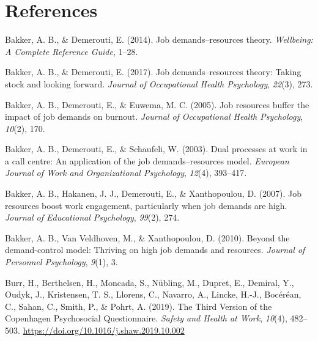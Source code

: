 \documentclass[
  man]{apa6}
\newlength{\cslhangindent}
\newlength{\cslentryspacingunit} %
\newenvironment{CSLReferences}[2] %
 {%
  \setlength{\parindent}{0pt}
  \ifodd #1
  \let\oldpar\par
  \def\par{\hangindent=\cslhangindent\oldpar}
  \fi
  \setlength{\parskip}{#2\cslentryspacingunit}
 }%
 {}
\begin{document}
\newpage

\hypertarget{references}{%
\section{References}\label{references}}

\begingroup
\setlength{\parindent}{-0.5in}
\setlength{\leftskip}{0.5in}

\hypertarget{refs}{}
\begin{CSLReferences}{1}{0}
\leavevmode{}%
Bakker, A. B., \& Demerouti, E. (2014). Job demands--resources theory. \emph{Wellbeing: A Complete Reference Guide}, 1--28.

\leavevmode{}%
Bakker, A. B., \& Demerouti, E. (2017). Job demands--resources theory: Taking stock and looking forward. \emph{Journal of Occupational Health Psychology}, \emph{22}(3), 273.

\leavevmode{}%
Bakker, A. B., Demerouti, E., \& Euwema, M. C. (2005). Job resources buffer the impact of job demands on burnout. \emph{Journal of Occupational Health Psychology}, \emph{10}(2), 170.

\leavevmode{}%
Bakker, A. B., Demerouti, E., \& Schaufeli, W. (2003). Dual processes at work in a call centre: An application of the job demands--resources model. \emph{European Journal of Work and Organizational Psychology}, \emph{12}(4), 393--417.

\leavevmode{}%
Bakker, A. B., Hakanen, J. J., Demerouti, E., \& Xanthopoulou, D. (2007). Job resources boost work engagement, particularly when job demands are high. \emph{Journal of Educational Psychology}, \emph{99}(2), 274.

\leavevmode{}%
Bakker, A. B., Van Veldhoven, M., \& Xanthopoulou, D. (2010). Beyond the demand-control model: Thriving on high job demands and resources. \emph{Journal of Personnel Psychology}, \emph{9}(1), 3.

\leavevmode{}%
Burr, H., Berthelsen, H., Moncada, S., Nübling, M., Dupret, E., Demiral, Y., Oudyk, J., Kristensen, T. S., Llorens, C., Navarro, A., Lincke, H.-J., Bocéréan, C., Sahan, C., Smith, P., \& Pohrt, A. (2019). The {Third} {Version} of the {Copenhagen} {Psychosocial} {Questionnaire}. \emph{Safety and Health at Work}, \emph{10}(4), 482--503. \url{https://doi.org/10.1016/j.shaw.2019.10.002}


\end{CSLReferences}
\end{document}
